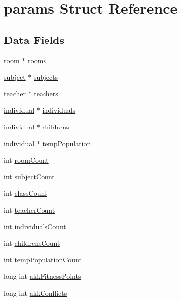 \hypertarget{structparams}{}\section{params Struct Reference}
\label{structparams}
\subsection*{Data Fields}
\begin{DoxyCompactItemize}
\item 
\hyperlink{structroom}{room} $\ast$ \hyperlink{structparams_a90276c18a08cf33875cf493a4cdaa804}{rooms}
\item 
\hyperlink{structsubject}{subject} $\ast$ \hyperlink{structparams_ac0065089e5d0a97eab579cb4c6d7b81e}{subjects}
\item 
\hyperlink{structteacher}{teacher} $\ast$ \hyperlink{structparams_a97805952f15a81f9f4555ccf10e03ace}{teachers}
\item 
\hyperlink{structindividual}{individual} $\ast$ \hyperlink{structparams_a34fb92547357a1c7f92c3a6fabb2f80a}{individuals}
\item 
\hyperlink{structindividual}{individual} $\ast$ \hyperlink{structparams_abf705e1aa269afb40b47480fe463009f}{childrens}
\item 
\hyperlink{structindividual}{individual} $\ast$ \hyperlink{structparams_af22352163e1202f216654fdb35c5870a}{temp\+Population}
\item 
int \hyperlink{structparams_a90c3ccdd5d149c3fa002c1bb5bde0a20}{room\+Count}
\item 
int \hyperlink{structparams_ac4fe83020d0e3e589c5bbdaee56ea773}{subject\+Count}
\item 
int \hyperlink{structparams_ab24cae7eb61eafa1eab4b60a637dcd54}{class\+Count}
\item 
int \hyperlink{structparams_a2039ccbb20de4e0c03414b44da9687a6}{teacher\+Count}
\item 
int \hyperlink{structparams_aeca69d2fb21ed26b662e49d760c2e332}{individuals\+Count}
\item 
int \hyperlink{structparams_a4ba2f1442d3c206a25d4621420d892db}{childrens\+Count}
\item 
int \hyperlink{structparams_a9af1335fe713a9463db9a4cfa7040504}{temp\+Population\+Count}
\item 
long int \hyperlink{structparams_a396ffba445476cab3ea4da965ec8dfcd}{akk\+Fitness\+Points}
\item 
long int \hyperlink{structparams_a65246c200b5a0a3b217127742e782a70}{akk\+Conflicts}

\end{DoxyCompactItemize}
